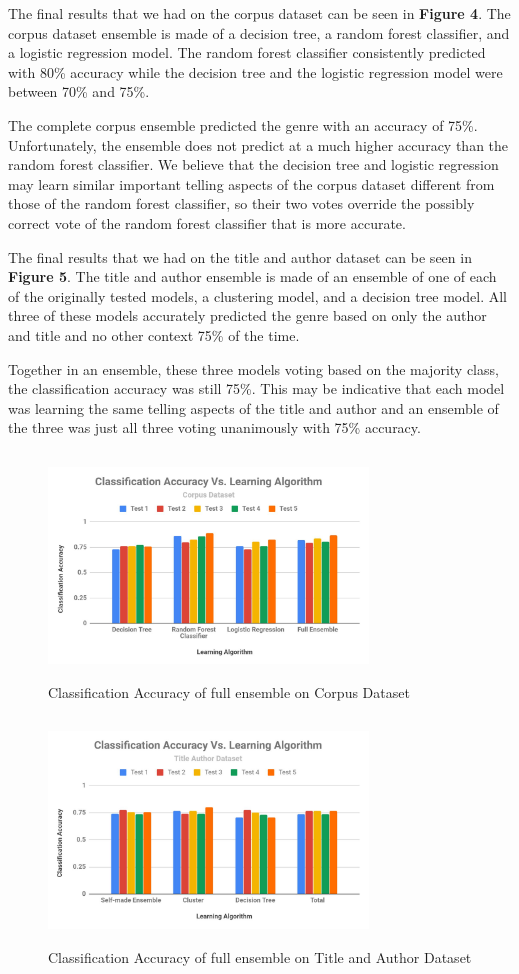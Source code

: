 \documentclass{article}
\begin{document}
The final results that we had on the corpus dataset can be seen in \textbf{Figure 4}. The corpus dataset ensemble is made of a decision tree, a random forest classifier, and a logistic regression model. The random forest classifier consistently predicted with 80\% accuracy while the decision tree and the logistic regression model were between 70\% and 75\%. \par
The complete corpus ensemble predicted the genre with an accuracy of 75\%. Unfortunately, the ensemble does not predict at a much higher accuracy than the random forest classifier. We believe that the decision tree and logistic regression may learn similar important telling aspects of the corpus dataset different from those of the random forest classifier, so their two votes override the possibly correct vote of the random forest classifier that is more accurate. \par
The final results that we had on the title and author dataset can be seen in \textbf{Figure 5}. The title and author ensemble is made of an ensemble of one of each of the originally tested models, a clustering model, and a decision tree model. All three of these models accurately predicted the genre based on only the author and title and no other context 75\% of the time. \par
Together in an ensemble, these three models voting based on the majority class, the classification accuracy was still 75\%. This may be indicative that each model was learning the same telling aspects of the title and author and an ensemble of the three was just all three voting unanimously with 75\% accuracy.
\begin{figure}
  \includegraphics[width=8.5cm,height=6cm]{Figure4.JPG}
  \caption{Classification Accuracy of full ensemble on Corpus Dataset}
\end{figure}
\begin{figure}
  \includegraphics[width=8.5cm,height=6cm]{Figure5.JPG}
  \caption{Classification Accuracy of full ensemble on Title and Author Dataset}
\end{figure}
\end{document}
